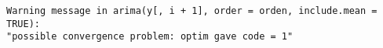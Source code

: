 \documentclass[11pt]{article}
\begin{document}
    \begin{Verbatim}[commandchars=\\\{\}]
Warning message in arima(y[, i + 1], order = orden, include.mean = TRUE):
"possible convergence problem: optim gave code = 1"
    \end{Verbatim}

    \begin{center}
    \end{center}
    { \hspace*{\fill} \\}
    
    \begin{center}
    \end{center}
    { \hspace*{\fill} \\}
    
\end{document}
